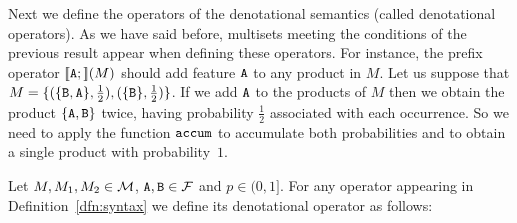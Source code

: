 Next we define the operators of the denotational semantics (called denotational operators). As we have said before, multisets
meeting the conditions of the previous result appear when
defining these operators. For instance, the prefix operator
$[\![{\mathtt{A}};]\!](M)$ should add feature ${\mathtt{A}}$ to any product in $M$. Let us
suppose that
$M=\{
   (\{{\mathtt{B}},{\mathtt{A}}\},\frac{1}{2}),
   (\{{\mathtt{B}}\},\frac{1}{2})\}$.
If we add ${\mathtt{A}}$ to the products of $M$ then we obtain the product
$\{{\mathtt{A}},{\mathtt{B}}\}$ twice, having probability $\frac{1}{2}$ associated with each occurrence. So we
need to apply the function $\mathtt{accum}$ to accumulate both probabilities
and to obtain a single product with probability~$1$.


\bdfn\label{def:semantic:operators}
  Let $M,M_1,M_2\in{\cal M}$, ${\mathtt{A}},{\mathtt{B}}\in{\cal F}$ and $p\in(0,1]$. For any operator appearing in
  Definition~\ref{dfn:syntax} we define its denotational operator
  as follows:
